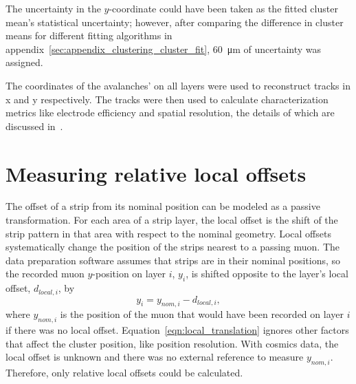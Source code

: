 The uncertainty in the $y$-coordinate could have been taken as the fitted cluster mean's statistical uncertainty; however, after comparing the difference in cluster means for different fitting algorithms in appendix~\ref{sec:appendix_clustering_cluster_fit}, \SI{60}{\micro\meter} of uncertainty was assigned.

The coordinates of the avalanches' on all layers were used to reconstruct tracks in x and y respectively. The tracks were then used to calculate characterization metrics like electrode efficiency and spatial resolution, the details of which are discussed in~\cite{lefebvre_thesis}.



\section{Measuring relative local offsets}

The offset of a strip from its nominal position can be modeled as a passive transformation. For each area of a strip layer, the local offset is the shift of the strip pattern in that area with respect to the nominal geometry.  Local offsets systematically change the position of the strips nearest to a passing muon. The data preparation software assumes that strips are in their nominal positions, so the recorded muon $y$-position on layer $i$, $y_i$, is shifted opposite to the layer's local offset, $d_{local, i}$, by
\begin{equation}
    y_i = y_{nom, i} - d_{local, i},
    \label{eqn:local_translation}
\end{equation}
where $y_{nom, i}$ is the position of the muon that would have been recorded on layer $i$ if there was no local offset. Equation~\ref{eqn:local_translation} ignores other factors that affect the cluster position, like position resolution. With cosmics data, the local offset is unknown and there was no external reference to measure $y_{nom, i}$. Therefore, only relative local offsets could be calculated. 

